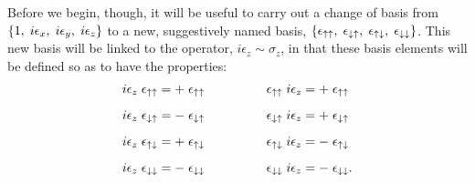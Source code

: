 \documentclass[letterpaper,12pt,titlepage,oneside,final]{book}
\begin{document}
Before we begin, though, it will be useful to carry out a change of basis from $\{1, \hspace{1mm}i{\epsilon_x}, \hspace{1mm}i{\epsilon_y}, \hspace{1mm}i{\epsilon_z}\}$ to a new, suggestively named basis, $\{\epsilon_{\uparrow \uparrow},  \hspace{1mm} \epsilon_{\downarrow \uparrow},\hspace{1mm} \epsilon_{\uparrow \downarrow},\hspace{1mm} \epsilon_{\downarrow \downarrow} \}$.  This new basis will be linked to the operator, $i{\epsilon_z}\sim \sigma_z$, in that these basis elements will be defined so as to have the properties:
\begin{equation}
\begin{array}{lll}
i{\epsilon_z}\hspace{1mm}\epsilon_{\uparrow \uparrow} = +\hspace{1mm} \epsilon_{\uparrow \uparrow} & \hspace{1cm} &\epsilon_{\uparrow \uparrow}\hspace{1mm}i{\epsilon_z} = +\hspace{1mm} \epsilon_{\uparrow \uparrow}\vspace{3mm} \\

i{\epsilon_z}\hspace{1mm}\epsilon_{\downarrow \uparrow} = -\hspace{1mm}\epsilon_{\downarrow \uparrow} & \hspace{1cm} &\epsilon_{\downarrow \uparrow}\hspace{1mm}i{\epsilon_z} = +\hspace{1mm}\epsilon_{\downarrow \uparrow}\vspace{3mm} \\

i{\epsilon_z}\hspace{1mm}\epsilon_{\uparrow \downarrow} = +\hspace{1mm}\epsilon_{\uparrow \downarrow} & \hspace{1cm} &\epsilon_{\uparrow \downarrow}\hspace{1mm}i{\epsilon_z} = -\hspace{1mm}\epsilon_{\uparrow \downarrow}\vspace{3mm} \\

i{\epsilon_z}\hspace{1mm}\epsilon_{\downarrow \downarrow} = -\hspace{1mm}\epsilon_{\downarrow \downarrow} & \hspace{1cm} &\epsilon_{\downarrow \downarrow}\hspace{1mm}i{\epsilon_z} = -\hspace{1mm}\epsilon_{\downarrow \downarrow}.\vspace{3mm} \\
\end{array}
\end{equation}
\end{document}
